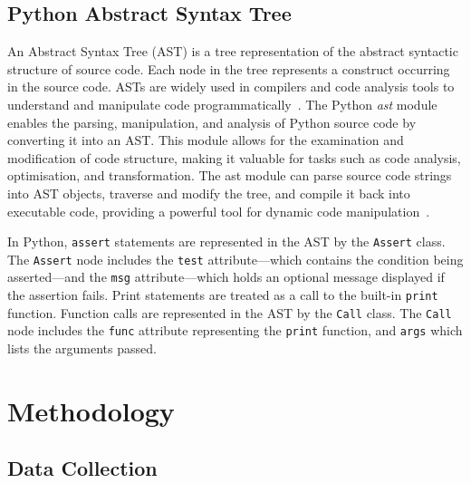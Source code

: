 \subsection{Python Abstract Syntax Tree}


An Abstract Syntax Tree (AST) is a tree representation of the abstract syntactic structure of source code. Each node in the tree represents a construct occurring in the source code. ASTs are widely used in compilers and code analysis tools to understand and manipulate code programmatically~\cite{wikipedia2024abstract}. The Python \emph{ast} module enables the parsing, manipulation, and analysis of Python source code by converting it into an AST. This module allows for the examination and modification of code structure, making it valuable for tasks such as code analysis, optimisation, and transformation. The ast module can parse source code strings into AST objects, traverse and modify the tree, and compile it back into executable code, providing a powerful tool for dynamic code manipulation~\cite{pythonast}.

In Python, \lstinline{assert} statements are represented in the AST by the \lstinline{Assert} class. The \lstinline{Assert} node includes the \lstinline{test} attribute---which contains the condition being asserted---and the \lstinline{msg} attribute---which holds an optional message displayed if the assertion fails. Print statements are treated as a call to the built-in \lstinline{print} function. Function calls are represented in the AST by the \lstinline{Call} class. The \lstinline{Call} node includes the \lstinline{func} attribute representing the \lstinline{print} function, and \lstinline{args} which lists the arguments passed.

\section{Methodology}

\subsection{Data Collection}\label{sec:data-collect}


